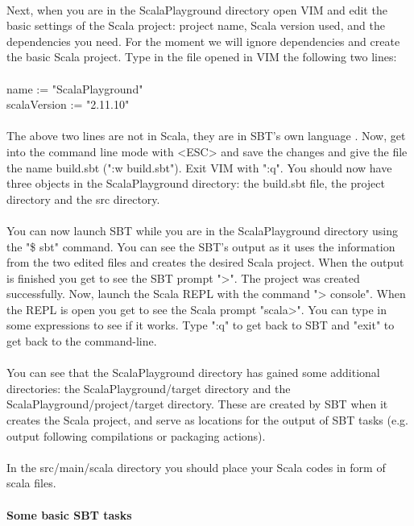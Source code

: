 \documentclass {article}
\begin{document}
\\
Next, when you are in the Scala\underline{\space}Playground directory open VIM and edit the basic settings of the Scala project: project name, Scala version used, and the dependencies you need. 
For the moment we will ignore dependencies and create the basic Scala project.
 Type in the file opened in VIM the following two lines:
\\
\\
name := "Scala\underline{\space}Playground"\\
scalaVersion := "2.11.10"
\\
\\
The above two lines are not in Scala, they are in SBT's own language \cite{suereth_sbt_2016}.
Now, get into the command line mode with <ESC> and save the changes and give the file the name build.sbt (":w build.sbt").
 Exit VIM with ":q". 
 You should now have three objects in the Scala\underline{\space}Playground directory: the build.sbt file, the project directory and the src directory. 
\\
\\  
You can now launch SBT while you are in the Scala\underline{\space}Playground directory using the "\$ sbt" command. 
You can see the SBT's output as it uses the information from the two edited files and creates the desired Scala project.
 When the output is finished you get to see the SBT prompt ">".
 The project was created successfully.
 Now, launch the Scala REPL with the command "> console". When the REPL is open you get to see the Scala prompt "scala>". 
You can type in some expressions to see if it works. 
Type ":q" to get back to SBT and "exit" to get back to the command-line. 
\\
\\
You can see that the Scala\underline{\space}Playground directory has gained some additional directories: the Scala\underline{\space}Playground/target directory and the Scala\underline{\space}Playground/project/target directory.
 These are created by SBT when it creates the Scala project, and serve as locations for the output of SBT tasks (e.g. output following compilations or packaging actions).  
\\
\\
In the src/main/scala directory you should place your Scala codes in form of scala files.   

\paragraph{Some basic SBT tasks}
\end{document}

